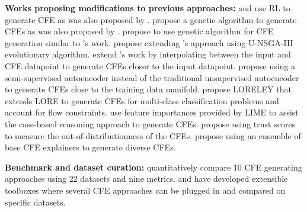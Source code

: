 \textbf{Works proposing modifications to previous approaches: }
\citet{RL-for-CFE-relace-paper} and \citet{RL-for-CFE-mcts-paper} use RL to generate CFE as was also proposed by \citet{verma2021amortized}. 
\citet{rasouli2022CARE-CFE} propose a genetic algorithm to generate CFEs as was also proposed by \citet{dandl_multi-objective_2020}. 
\citet{CFE_genetic_creditscorecards} propose to use genetic algorithm for CFE generation similar to \citet{dandl_multi-objective_2020}'s work. 
\citet{another-genetic-algo-monteiro} propose extending \citet{dandl_multi-objective_2020}'s approach using U-NSGA-III evolutionary algorithm. 
\citet{mahajan-work-extension-linear-interpolation} extend \citet{mahajan_preserving_2020}'s work by interpolating between the input and CFE datapoint to generate CFEs closer to the input datapoint. 
\citet{semi-supervised-autoencoder-cfe} propose using a semi-supervised autoencoder instead of the traditional unsupervised autoencoder to generate CFEs close to the training data manifold. 
\citet{Loreley-huang-2022} propose LORELEY that extends LORE \citep{guidotti_local_2018} to generate CFEs for multi-class classification problems and account for flow constraints. 
\citet{student-moodle-cfe-cbr-technique} use feature importances provided by LIME to assist the case-based reasoning approach to generate CFEs. 
\citet{Delaney2021Uncertainty-CFE} propose using trust scores to measure the out-of-distributionness of the CFEs. 
\citet{guidotti-cfe-ensemble-of-explainers} propose using an ensemble of base CFE explainers to generate diverse CFEs. 

\textbf{Benchmark and dataset curation: }
\citet{cfe-algos-quantitative-comparison-survey} quantitatively compare 10 CFE generating approaches using 22 datasets and nine metrics. 
\citet{pawelczyk2021CARLA-toolbox} and \citet{artelt-ceml-toolbox} have developed extensible toolboxes where several CFE approaches can be plugged in and compared on specific datasets. 


